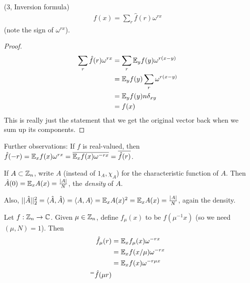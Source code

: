 \documentclass[a4paper]{article}
\begin{document}
\begin{lemma} (3, Inversion formula)\\
    \begin{equation*}
        \begin{aligned}
            f(x) = \sum_r \hat{f}(r) \omega^{rx}
        \end{aligned}
    \end{equation*}
    (note the sign of $\omega^{rx}$).
    \begin{proof}
        \begin{equation*}
            \begin{aligned}
                \sum_r \hat{f}(r) \omega^{rx} &= \sum_r \mathbb{E}_y f(y) \omega^{r(x-y)}\\
                &= \mathbb{E}_y f(y) \sum_r \omega^{r(x-y)}\\
                &= \mathbb{E}_y f(y) n\delta_{xy}\\
                &=f(x)
            \end{aligned}
        \end{equation*}
        This is really just the statement that we get the original vector back when we sum up its components.
    \end{proof}
\end{lemma}

Further observations: If $f$ is real-valued, then $\hat{f}(-r) = \mathbb{E}_x f(x) \omega^{rx} = \overline{\mathbb{E}_x f(x) \omega^{-rx}} = \overline{\hat{f}(r)}$.

If $A \subset \mathbb{Z}_n$, write $A$ (instead of $1_A,\chi_A$) for the characteristic function of $A$. Then $\hat{A}(0) = \mathbb{E}_x A(x) = \frac{|A|}{N}$, the \emph{density} of $A$.

Also, $||\hat{A}||^2_2 = \langle\hat{A},\hat{A}\rangle = \langle A,A\rangle = \mathbb{E}_x A(x)^2 = \mathbb{E}_x A(x) = \frac{|A|}{N}$, again the density.

Let $f:\mathbb{Z}_n \to \mathbb{C}$. Given $\mu \in \mathbb{Z}_n$, define $f_\mu(x)$ to be $f(\mu^{-1}x)$ (so we need $(\mu,N) = 1$). Then
\begin{equation*}
    \begin{aligned}
        \hat{f}_\mu(r) &= \mathbb{E}_x f_\mu (x) \omega^{-rx}\\
        &= \mathbb{E}_x f(x/\mu) \omega^{-rx}\\
        &=\mathbb{E}_x f(x) \omega^{-r\mu x}\\
        ^= \hat{f}(\mu r)
    \end{aligned}
\end{equation*}
\end{document}
